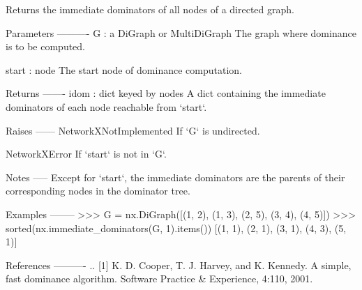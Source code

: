 \begin{DoxyVerb}Returns the immediate dominators of all nodes of a directed graph.

Parameters
----------
G : a DiGraph or MultiDiGraph
    The graph where dominance is to be computed.

start : node
    The start node of dominance computation.

Returns
-------
idom : dict keyed by nodes
    A dict containing the immediate dominators of each node reachable from
    `start`.

Raises
------
NetworkXNotImplemented
    If `G` is undirected.

NetworkXError
    If `start` is not in `G`.

Notes
-----
Except for `start`, the immediate dominators are the parents of their
corresponding nodes in the dominator tree.

Examples
--------
>>> G = nx.DiGraph([(1, 2), (1, 3), (2, 5), (3, 4), (4, 5)])
>>> sorted(nx.immediate_dominators(G, 1).items())
[(1, 1), (2, 1), (3, 1), (4, 3), (5, 1)]

References
----------
.. [1] K. D. Cooper, T. J. Harvey, and K. Kennedy.
       A simple, fast dominance algorithm.
       Software Practice & Experience, 4:110, 2001.
\end{DoxyVerb}
 